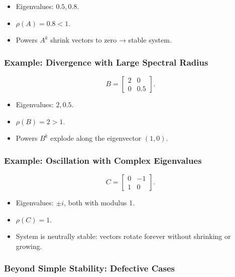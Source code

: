\documentclass[
  letterpaper,
  DIV=11,
  numbers=noendperiod]{scrreprt}
\providecommand{\tightlist}{%
  \setlength{\itemsep}{0pt}\setlength{\parskip}{0pt}}
\begin{document}
\begin{itemize}
\tightlist
\item
  Eigenvalues: \(0.5, 0.8\).
\item
  \(\rho(A) = 0.8 < 1\).
\item
  Powers \(A^k\) shrink vectors to zero → stable system.
\end{itemize}

\subsubsection{Example: Divergence with Large Spectral
Radius}\label{example-divergence-with-large-spectral-radius}

\[
B = \begin{bmatrix} 2 & 0 \\ 0 & 0.5 \end{bmatrix}.
\]

\begin{itemize}
\tightlist
\item
  Eigenvalues: \(2, 0.5\).
\item
  \(\rho(B) = 2 > 1\).
\item
  Powers \(B^k\) explode along the eigenvector \((1,0)\).
\end{itemize}

\subsubsection{Example: Oscillation with Complex
Eigenvalues}\label{example-oscillation-with-complex-eigenvalues}

\[
C = \begin{bmatrix} 0 & -1 \\ 1 & 0 \end{bmatrix}.
\]

\begin{itemize}
\tightlist
\item
  Eigenvalues: \(\pm i\), both with modulus 1.
\item
  \(\rho(C) = 1\).
\item
  System is neutrally stable: vectors rotate forever without shrinking
  or growing.
\end{itemize}

\subsubsection{Beyond Simple Stability: Defective
Cases}\label{beyond-simple-stability-defective-cases}
\end{document}
